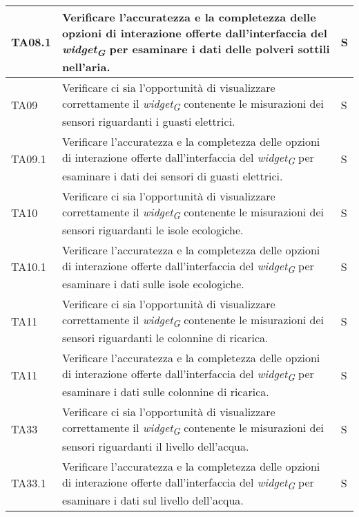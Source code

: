 \begin{longtable}{|C{1.9cm}|L{5cm}|C{2cm}|}
    TA08.1 & Verificare l'accuratezza e la completezza delle opzioni di interazione offerte dall'interfaccia del \textit{widget}\textsubscript{\textit{G}} per esaminare i dati delle polveri sottili nell'aria. & S \\
    \hline
    
    TA09 & Verificare ci sia l'opportunità di visualizzare correttamente il \textit{widget}\textsubscript{\textit{G}} contenente le misurazioni dei sensori riguardanti i guasti elettrici. & S \\
    \hline
    
    TA09.1 & Verificare l'accuratezza e la completezza delle opzioni di interazione offerte dall'interfaccia del \textit{widget}\textsubscript{\textit{G}} per esaminare i dati dei sensori di guasti elettrici. & S \\
    \hline
    
    TA10 & Verificare ci sia l'opportunità di visualizzare correttamente il \textit{widget}\textsubscript{\textit{G}} contenente le misurazioni dei sensori riguardanti le isole ecologiche. & S \\
    \hline
    
    TA10.1 & Verificare l'accuratezza e la completezza delle opzioni di interazione offerte dall'interfaccia del \textit{widget}\textsubscript{\textit{G}} per esaminare i dati sulle isole ecologiche. & S \\
    \hline
    
    TA11 & Verificare ci sia l'opportunità di visualizzare correttamente il \textit{widget}\textsubscript{\textit{G}} contenente le misurazioni dei sensori riguardanti le colonnine di ricarica. & S \\
    \hline
    
    TA11 & Verificare l'accuratezza e la completezza delle opzioni di interazione offerte dall'interfaccia del \textit{widget}\textsubscript{\textit{G}} per esaminare i dati sulle colonnine di ricarica. & S \\
    \hline
    
    TA33 & Verificare ci sia l'opportunità di visualizzare correttamente il \textit{widget}\textsubscript{\textit{G}} contenente le misurazioni dei sensori riguardanti il livello dell'acqua. & S \\
    \hline
    
    TA33.1 & Verificare l'accuratezza e la completezza delle opzioni di interazione offerte dall'interfaccia del \textit{widget}\textsubscript{\textit{G}} per esaminare i dati sul livello dell'acqua. & S \\
    \hline
    

\end{longtable}

